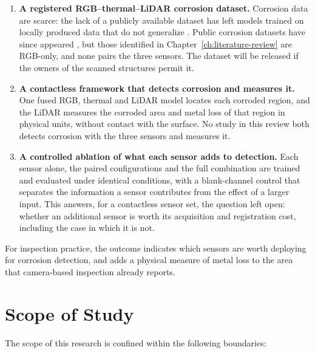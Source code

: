 \begin{enumerate}[label=\arabic*),leftmargin=*,itemsep=5pt]
  \item \textbf{A registered RGB--thermal--LiDAR corrosion dataset.}
        Corrosion data are scarce: the lack of a publicly available dataset
        has left models trained on locally produced data that do not
        generalize \citep{Nash2022}. Public corrosion datasets have since
        appeared \citep{Espinoza2026}, but those identified in
        Chapter~\ref{ch:literature-review} are RGB-only, and none pairs the
        three sensors. The dataset will be
        released if the owners of the scanned structures permit it.
  \item \textbf{A contactless framework that detects corrosion and measures
        it.} One fused RGB, thermal and LiDAR model locates each corroded
        region, and the LiDAR measures the corroded area and metal loss of that
        region in physical units, without contact with the surface. No study in
        this review both detects corrosion with the three sensors and measures
        it.
  \item \textbf{A controlled ablation of what each sensor adds to
        detection.} Each sensor alone, the paired configurations and the full
        combination are trained and evaluated under identical conditions, with
        a blank-channel control that separates the information a sensor
        contributes from the effect of a larger input. This answers, for a
        contactless sensor set, the question \citet{Haitz2022} left open:
        whether an additional sensor is worth its acquisition and registration
        cost, including the case in which it is not.
\end{enumerate}

For inspection practice, the outcome indicates which sensors are worth
deploying for corrosion detection, and adds a physical measure of metal loss to
the area that camera-based inspection already reports.

\section{Scope of Study}
\label{sec:scope}

The scope of this research is confined within the following boundaries:

